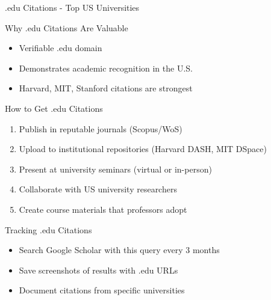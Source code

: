 \documentclass[11pt]{beamer}
\begin{document}
	\begin{frame}{.edu Citations - Top US Universities}
		\scriptsize
		\begin{block}{Why .edu Citations Are Valuable}
			\begin{itemize}
				\item Verifiable .edu domain
				\item Demonstrates academic recognition in the U.S.
				\item Harvard, MIT, Stanford citations are strongest
			\end{itemize}
		\end{block}
		\begin{block}{How to Get .edu Citations}
			\begin{enumerate}
				\item Publish in reputable journals (Scopus/WoS)
				\item Upload to institutional repositories (Harvard DASH, MIT DSpace)
				\item Present at university seminars (virtual or in-person)
				\item Collaborate with US university researchers
				\item Create course materials that professors adopt
			\end{enumerate}
		\end{block}
		\begin{block}{Tracking .edu Citations}
			\begin{itemize}
				\item Search Google Scholar with this query every 3 months
				\item Save screenshots of results with .edu URLs
				\item Document citations from specific universities
			\end{itemize}
		\end{block}
	\end{frame}
	
\end{document}
